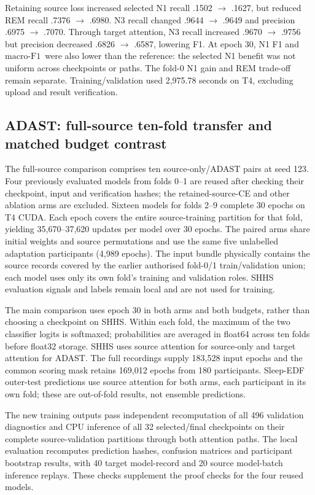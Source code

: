 \documentclass[10pt,a4paper]{article}
\newcommand{\mf}{\ensuremath{\mathrm{macro\text{-}F1}}}
\begin{document}
Retaining source loss increased selected N1 recall .1502 $\rightarrow$ .1627, but reduced
REM recall .7376 $\rightarrow$ .6980. N3 recall changed .9644 $\rightarrow$ .9649 and
precision .6975 $\rightarrow$ .7070. Through target attention, N3 recall increased
.9670 $\rightarrow$ .9756 but precision decreased .6826 $\rightarrow$ .6587, lowering
F1. At epoch 30, N1 F1
and \mf\ were also lower than the reference: the selected N1 benefit was not uniform
across checkpoints or paths. The fold-0 N1 gain and REM trade-off remain separate.
Training/validation used 2,975.78 seconds on T4, excluding upload and result verification.

\subsection*{ADAST: full-source ten-fold transfer and matched budget contrast}

The full-source comparison comprises ten source-only/ADAST pairs at seed 123.
Four previously evaluated models from folds 0--1 are reused after checking their
checkpoint, input and verification hashes; the retained-source-CE and other ablation
arms are excluded. Sixteen models for folds 2--9 complete 30 epochs on T4 CUDA.
Each epoch covers the entire source-training partition for that fold, yielding
35,670--37,620 updates per model over 30 epochs. The paired arms share initial
weights and source permutations and use the same five unlabelled adaptation
participants (4,989 epochs). The input bundle physically contains the source
records covered by the earlier authorised fold-0/1 train/validation union; each
model uses only its own fold's training and validation roles. SHHS evaluation
signals and labels remain local and are not used for training.

The main comparison uses epoch 30 in both arms and both budgets, rather than
choosing a checkpoint on SHHS. Within each fold, the maximum of the two classifier
logits is softmaxed; probabilities are averaged in float64 across ten folds before
float32 storage. SHHS uses source attention for source-only and target attention
for ADAST. The full recordings supply 183,528 input epochs and the common scoring
mask retains 169,012 epochs from 180 participants. Sleep-EDF outer-test predictions
use source attention for both arms, each participant in its own fold; these are
out-of-fold results, not ensemble predictions.

The new training outputs pass independent recomputation of all 496 validation
diagnostics and CPU inference of all 32 selected/final checkpoints on their complete
source-validation partitions through both attention paths. The local evaluation
recomputes prediction hashes, confusion matrices and participant bootstrap results,
with 40 target model-record and 20 source model-batch inference replays. These
checks supplement the proof checks for the four reused models.
\end{document}
